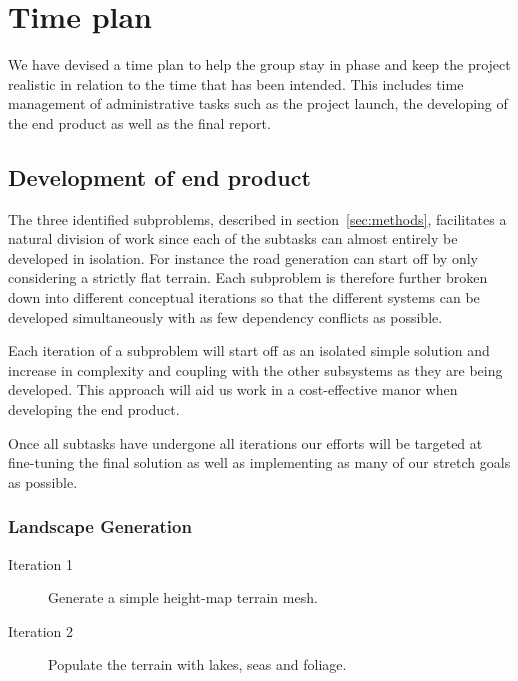 \section{Time plan}

We have devised a time plan to help the group stay in phase and keep the project realistic in relation to the time that has been intended.
This includes time management of administrative tasks such as the project launch, the developing of the end product as well as the final report.

\subsection{Development of end product}
The three identified subproblems, described in section~\ref{sec:methods}, facilitates a natural division of work since each of the subtasks can almost entirely be developed in isolation.
For instance the road generation can start off by only considering a strictly flat terrain.
Each subproblem is therefore further broken down into different conceptual iterations so that the different systems can be developed simultaneously with as few dependency conflicts as possible.

Each iteration of a subproblem will start off as an isolated simple solution and increase in complexity and coupling with the other subsystems as they are being developed.
This approach will aid us work in a cost-effective manor when developing the end product.

Once all subtasks have undergone all iterations our efforts will be targeted at fine-tuning the final solution as well as implementing as many of our stretch goals as possible.

\subsubsection{Landscape Generation}
\begin{description}
  \item[Iteration 1] Generate a simple height-map terrain mesh.
  \item[Iteration 2] Populate the terrain with lakes, seas and foliage.
\end{description}

